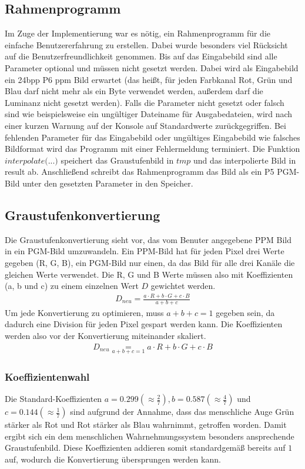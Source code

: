 \documentclass[course=erap]{aspdoc}
\begin{document}
\subsection{Rahmenprogramm}
Im Zuge der Implementierung war es nötig, ein Rahmenprogramm für die einfache Benutzererfahrung zu erstellen. Dabei wurde besonders viel Rücksicht auf die Benutzerfreundlichkeit genommen. Bis auf das Eingabebild sind alle Parameter optional und müssen nicht gesetzt werden. Dabei wird als Eingabebild ein 24bpp P6 ppm Bild erwartet (das heißt, für jeden Farbkanal Rot, Grün und Blau darf nicht mehr als ein Byte verwendet werden, außerdem darf die Luminanz nicht gesetzt werden). Falls die Parameter nicht gesetzt oder falsch sind wie beispielsweise ein ungültiger Dateiname für Ausgabedateien, wird nach einer kurzen Warnung auf der Konsole auf Standardwerte zurückgegriffen. Bei fehlenden Parameter für das Eingabebild oder ungültiges Eingabebild wie falsches Bildformat wird das Programm mit einer Fehlermeldung terminiert. Die Funktion $interpolate($...$)$ speichert das Graustufenbild in $tmp$ und das interpolierte Bild in result ab. Anschließend schreibt das Rahmenprogramm das Bild als ein P5 PGM-Bild unter den gesetzten Parameter in den Speicher.

\subsection{Graustufenkonvertierung}
Die Graustufenkonvertierung sieht vor, das vom Benuter angegebene PPM Bild in ein PGM-Bild umzuwandeln. Ein PPM-Bild hat für jeden Pixel drei Werte gegeben (R, G, B), ein PGM-Bild nur einen, da das Bild für alle drei Kanäle die gleichen Werte verwendet. Die R, G und B Werte müssen also mit Koeffizienten (a, b und c) zu einem einzelnen Wert $D$ gewichtet werden.
 \begin{align}
    D_{neu} {=} \frac{a \cdot R + b \cdot G + c \cdot B}{a + b + c}
\end{align}
Um jede Konvertierung zu optimieren, muss $a + b + c = 1$ gegeben sein, da dadurch eine Division für jeden Pixel gespart werden kann. Die Koeffizienten werden also vor der Konvertierung miteinander skaliert.
 \begin{align}
    D_{neu} \underset{a + b + c = 1}{=} a \cdot R + b \cdot G + c \cdot B
\end{align}

\subsubsection{Koeffizientenwahl}
Die Standard-Koeffizienten $a = 0.299 (\approx \frac{2}{7}), b = 0.587 (\approx \frac{4}{7})$ und $c = 0.144 ( \approx \frac{1}{7})$ sind aufgrund der Annahme, dass das menschliche Auge Grün stärker als Rot und Rot stärker als Blau wahrnimmt, getroffen worden. Damit ergibt sich ein dem menschlichen Wahrnehmungssystem besonders ansprechende Graustufenbild. Diese Koeffizienten addieren somit standardgemäß bereits auf $1$ auf, wodurch die Konvertierung übersprungen werden kann. 
\end{document}
